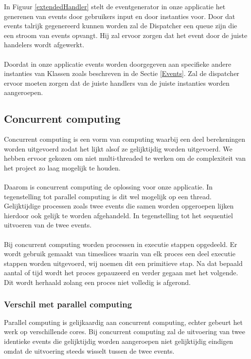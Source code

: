 \documentclass[]{article}
\begin{document}
In Figuur \ref{extendedHandler} stelt de eventgenerator in onze applicatie het generenen van events door gebruikers input en door instanties voor. Door dat events talrijk gegenereerd kunnen worden zal de Dispatcher een queue zijn die een stroom van events opvangt. Hij zal ervoor zorgen dat het event door de juiste handelers wordt afgewerkt.\\\\
Doordat in onze applicatie events worden doorgegeven aan specifieke andere instanties van Klassen zoals beschreven in de Sectie \ref{Events}. Zal de dispatcher ervoor moeten zorgen dat de juiste handlers van de juiste instanties worden aangeroepen.

\subsection{Concurrent computing }
Concurrent computing \cite{concurrent} is een vorm van computing waarbij een deel berekeningen worden uitgevoerd zodat het lijkt alsof ze gelijktijdig worden uitgevoerd. We hebben ervoor gekozen om niet multi-threaded te werken om de complexiteit van het project zo laag mogelijk te houden.\\\\ Daarom is concurrent computing de oplossing voor onze applicatie. In tegenstelling tot parallel computing is dit wel mogelijk op een thread. Gelijktijdige processen zoals twee events die samen worden opgeroepen lijken hierdoor ook gelijk te worden afgehandeld. In tegenstelling tot het sequentiel uitvoeren van de twee events.\\\\
Bij concurrent computing worden processen in executie stappen opgedeeld. Er wordt gebruik gemaakt van timeslices waarin van elk proces een deel executie stappen worden uitgevoerd, wij noemen dit een primitieve stap. Na dat bepaald aantal of tijd wordt het proces gepauzeerd en verder gegaan met het volgende. Dit wordt herhaald zolang een proces niet volledig is afgerond.
\subsubsection{Verschil met parallel computing}
Parallel computing is gelijkaardig aan concurrent computing, echter gebeurt het werk op verschillende cores. Bij concurrent computing zal de uitvoering van twee identieke events die gelijktijdig worden aangeroepen niet gelijktijdig eindigen omdat de uitvoering steeds wisselt tussen de twee events. 
\end{document}
